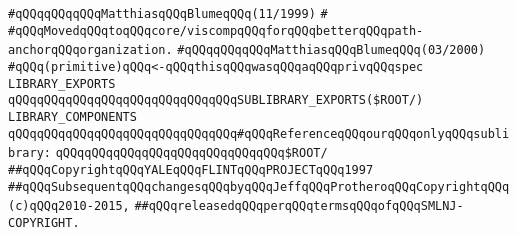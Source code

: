\verb|#qQQqqQQqqQQqMatthiasqQQqBlumeqQQq(11/1999)|\newline
\verb|#|\newline
\verb|#qQQqMovedqQQqtoqQQqcore/viscompqQQqforqQQqbetterqQQqpath-anchorqQQqorganization.|\newline
\verb|#qQQqqQQqqQQqMatthiasqQQqBlumeqQQq(03/2000)|\newline
\newline
\newline
\verb|#qQQq(primitive)qQQq<-qQQqthisqQQqwasqQQqaqQQqprivqQQqspec|\newline
\newline
\verb|LIBRARY_EXPORTS|\newline
\newline
\verb|qQQqqQQqqQQqqQQqqQQqqQQqqQQqqQQqSUBLIBRARY_EXPORTS($ROOT/|\verb|)|\newline
\newline
\newline
\newline
\verb|LIBRARY_COMPONENTS|\newline
\newline
\verb|qQQqqQQqqQQqqQQqqQQqqQQqqQQqqQQq#qQQqReferenceqQQqourqQQqonlyqQQqsublibrary:|\newline
\verb|qQQqqQQqqQQqqQQqqQQqqQQqqQQqqQQq$ROOT/|\newline
\newline
\newline
\newline
\verb|##qQQqCopyrightqQQqYALEqQQqFLINTqQQqPROJECTqQQq1997|\newline
\verb|##qQQqSubsequentqQQqchangesqQQqbyqQQqJeffqQQqProtheroqQQqCopyrightqQQq(c)qQQq2010-2015,|\newline
\verb|##qQQqreleasedqQQqperqQQqtermsqQQqofqQQqSMLNJ-COPYRIGHT.|\newline

